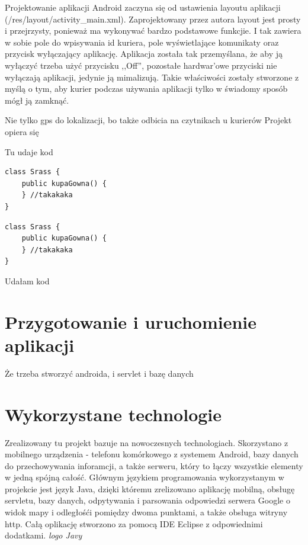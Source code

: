 \documentclass[eng,printmode,oneside]{mgr}
\begin{document}
Projektowanie aplikacji Android zaczyna się od ustawienia layoutu aplikacji
(/res/layout/activity\_main.xml). Zaprojektowany przez autora layout jest
prosty i przejrzysty, ponieważ ma wykonywać bardzo podstawowe funkcjie. I tak
zawiera w sobie pole do wpisywania id kuriera, pole wyświetlające komunikaty
oraz przycisk wyłączający aplikację. Aplikacja została tak przemyślana, że
aby ją wyłączyć trzeba użyć przycisku ,,Off'', pozostałe hardwar'owe przyciski
nie wyłączają aplikacji, jedynie ją mimalizują. Takie właściwości zostały
stworzone z myślą o tym, aby kurier podczas używania aplikacji tylko w świadomy
sposób mógł ją zamknąć.






 Nie tylko gps do lokalizacji, bo także odbicia
na czytnikach u kurierów Projekt opiera się 



Tu udaje kod
\lstset{style=listJava}
\begin{lstlisting}[caption={to jest podpis}]
class Srass {
	public kupaGowna() {
	} //takakaka
}
\end{lstlisting}
\lstset{style=listPython}
\begin{lstlisting}[caption={to jest podpis drugiego}]
class Srass {
	public kupaGowna() {
	} //takakaka
}
\end{lstlisting}

Udałam kod
\chapter{Przygotowanie i uruchomienie aplikacji}

Że trzeba stworzyć androida, i servlet i bazę danych

\chapter{Wykorzystane technologie}

Zrealizowany tu projekt bazuje na nowoczesnych technologiach.
Skorzystano z mobilnego urządzenia - telefonu komórkowego z systemem
Android, bazy danych do przechowywania inforamcji, a także serweru, który to
łączy wszystkie elementy w jedną spójną całość. Głównym językiem
programowania wykorzystanym w projekcie jest język Java, dzięki któremu
zrelizowano aplikację mobilną, obsługę servletu, bazy danych, odpytywania i
parsowania odpowiedzi serwera Google o widok mapy i odległośći pomiędzy dwoma
punktami, a także obsługa witryny http. Całą oplikację stworzono za pomocą IDE
Eclipse z odpowiednimi dodatkami.
\emph{\color{komentarz}logo Javy}
\end{document}
